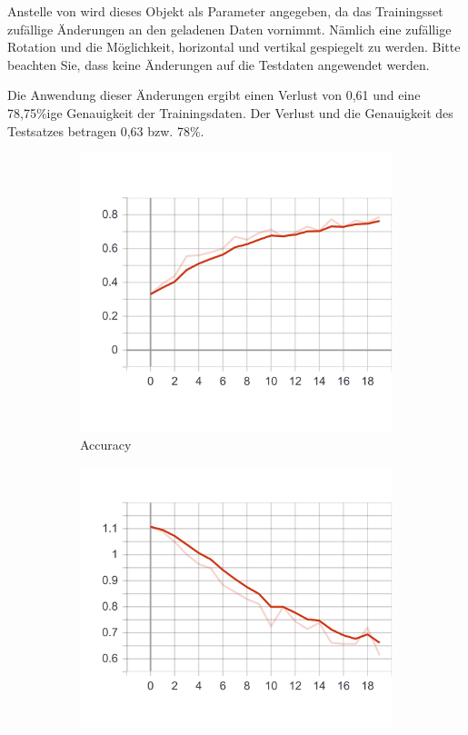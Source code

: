 Anstelle von  wird dieses Objekt als Parameter angegeben, da das Trainingsset zufällige Änderungen an den geladenen Daten vornimmt.
Nämlich eine zufällige Rotation und die Möglichkeit, horizontal und vertikal gespiegelt zu werden.
Bitte beachten Sie, dass keine Änderungen auf die Testdaten angewendet werden.

Die Anwendung dieser Änderungen ergibt einen Verlust von 0,61 und eine 78,75\%ige Genauigkeit der Trainingsdaten.
Der Verlust und die Genauigkeit des Testsatzes betragen 0,63 bzw. 78\%.

\begin{figure}
    \centering
    \begin{subfigure}[b]{0.4\textwidth}
        \includegraphics[width=\textwidth]{images/first_model_data_augmentation_acc.png}
        \caption{Accuracy}
        \label{fig:first_model_data_augmentation_acc}
    \end{subfigure}
    \begin{subfigure}[b]{0.4\textwidth}
        \includegraphics[width=\textwidth]{images/first_model_data_augmentation_loss.png}

\end{subfigure}
\end{figure}
